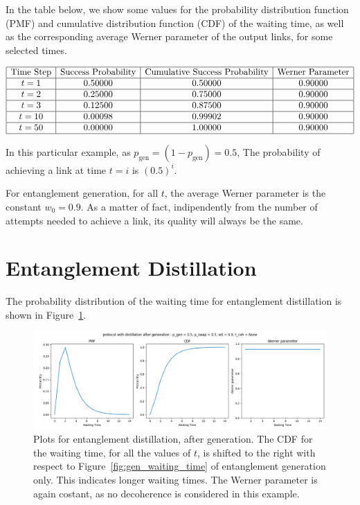\documentclass{masterthesis}
\begin{document}
In the table below, we show some values for the probability distribution function (PMF) and cumulative distribution function (CDF) of the waiting time, as well as the corresponding average Werner parameter of the output links, for some selected times.

\begin{equation*}
    \begin{array}{|c|c|c|c|}
        \hline
        \text{Time Step} & \text{Success Probability} & \text{Cumulative Success Probability} & \text{Werner Parameter} \\
        \hline
        t = 1 & 0.50000 & 0.50000 & 0.90000 \\
        \hline
        t = 2 & 0.25000 & 0.75000 & 0.90000 \\
        \hline
        t = 3 & 0.12500 & 0.87500 & 0.90000 \\
        \hline
        t = 10 & 0.00098 & 0.99902 & 0.90000 \\
        \hline
        t = 50 & 0.00000 & 1.00000 & 0.90000 \\
        \hline
    \end{array}
    \label{tab:gen_waiting_time}
\end{equation*}

In this particular example, as $p_\text{gen} = (1 - p_\text{gen}) = 0.5$, The probability of achieving a link at time $t = i$ is $(0.5)^i$.

For entanglement generation, for all $t$, the average Werner parameter is the constant $w_0 = 0.9$. As a matter of fact, indipendently from the number of attempts needed to achieve a link, its quality will always be the same.

\section{Entanglement Distillation}\label{section:entanglement_distillation_numerical_example}

The probability distribution of the waiting time for entanglement distillation is shown in Figure~\ref{fig:dist_waiting_time}.

\begin{figure}[ht]
    \centering
    \includegraphics[width=1\linewidth]{images/dist_tests/distillation after generation.png}
    \caption{Plots for entanglement distillation, after generation. The CDF for the waiting time, for all the values of $t$, is shifted to the right with respect to Figure~\ref{fig:gen_waiting_time} of entanglement generation only. This indicates longer waiting times. The Werner parameter is again costant, as no decoherence is considered in this example.}
    \label{fig:dist_waiting_time}
\end{figure}
\end{document}
